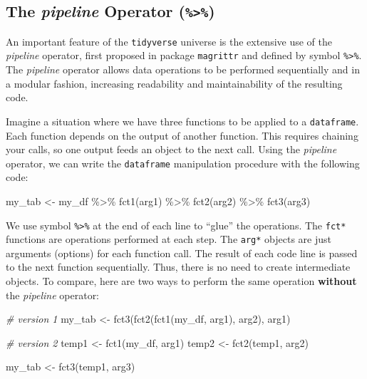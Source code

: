 \documentclass[
  12pt,
]{book}
\newenvironment{Shaded}{\begin{snugshade}}{\end{snugshade}}
\newcommand{\CommentTok}[1]{\textcolor[rgb]{0.37,0.37,0.37}{\textit{#1}}}
\newcommand{\FunctionTok}[1]{\textcolor[rgb]{0,0,0}{#1}}
\newcommand{\NormalTok}[1]{#1}
\newcommand{\OtherTok}[1]{\textcolor[rgb]{0.37,0.37,0.37}{#1}}
\newcommand{\SpecialCharTok}[1]{\textcolor[rgb]{0,0,0}{#1}}
\begin{document}
\hypertarget{the-pipeline-operator}{%
\subsection{\texorpdfstring{The \emph{pipeline} Operator (\texttt{\%\textgreater{}\%})}{The pipeline Operator (\%\textgreater\%)}}\label{the-pipeline-operator}}

An important feature of the \texttt{tidyverse} universe is the extensive use of the \emph{pipeline} operator, first proposed in package \texttt{magrittr} \citep{R-magrittr} and defined by symbol \texttt{\%\textgreater{}\%}. The \emph{pipeline} operator allows data operations to be performed sequentially and in a modular fashion, increasing readability and maintainability of the resulting code.

Imagine a situation where we have three functions to be applied to a \texttt{dataframe}. Each function depends on the output of another function. This requires chaining your calls, so one output feeds an object to the next call. Using the \emph{pipeline} operator, we can write the \texttt{dataframe} manipulation procedure with the following code: 

\begin{Shaded}
\begin{Highlighting}[]
\NormalTok{my\_tab }\OtherTok{\textless{}{-}}\NormalTok{ my\_df }\SpecialCharTok{\%\textgreater{}\%}
  \FunctionTok{fct1}\NormalTok{(arg1) }\SpecialCharTok{\%\textgreater{}\%}
  \FunctionTok{fct2}\NormalTok{(arg2) }\SpecialCharTok{\%\textgreater{}\%}
  \FunctionTok{fct3}\NormalTok{(arg3)}
\end{Highlighting}
\end{Shaded}

We use symbol \texttt{\%\textgreater{}\%} at the end of each line to ``glue'' the operations. The \texttt{fct*} functions are operations performed at each step. The \texttt{arg*} objects are just arguments (options) for each function call. The result of each code line is passed to the next function sequentially. Thus, there is no need to create intermediate objects. To compare, here are two ways to perform the same operation \textbf{without} the \emph{pipeline} operator:

\begin{Shaded}
\begin{Highlighting}[]
\CommentTok{\# version 1}
\NormalTok{my\_tab }\OtherTok{\textless{}{-}} \FunctionTok{fct3}\NormalTok{(}\FunctionTok{fct2}\NormalTok{(}\FunctionTok{fct1}\NormalTok{(my\_df,}
\NormalTok{                         arg1),}
\NormalTok{                    arg2),}
\NormalTok{               arg1)}

\CommentTok{\# version 2}
\NormalTok{temp1 }\OtherTok{\textless{}{-}} \FunctionTok{fct1}\NormalTok{(my\_df, arg1)}
\NormalTok{temp2 }\OtherTok{\textless{}{-}} \FunctionTok{fct2}\NormalTok{(temp1, arg2)}

\NormalTok{my\_tab }\OtherTok{\textless{}{-}} \FunctionTok{fct3}\NormalTok{(temp1, arg3)}
\end{Highlighting}
\end{Shaded}
\end{document}
